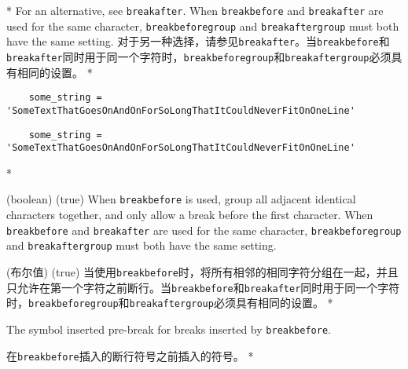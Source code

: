 \begin{paracol}{2}
\begin{optionlist}
\switchcolumn[0]*%
 For an alternative, see \texttt{breakafter}.  When \texttt{breakbefore} and \texttt{breakafter} are used for the same character, \texttt{breakbeforegroup} and \texttt{breakaftergroup} must both have the same setting.
 \switchcolumn
对于另一种选择，请参见\texttt{breakafter}。当\texttt{breakbefore}和\texttt{breakafter}同时用于同一个字符时，\texttt{breakbeforegroup}和\texttt{breakaftergroup}必须具有相同的设置。
\switchcolumn[0]*%
\begin{longexample}
    \begin{verbatim}
    some_string = 'SomeTextThatGoesOnAndOnForSoLongThatItCouldNeverFitOnOneLine'
    \end{verbatim}
\end{longexample}
\switchcolumn
\begin{longexample}
    \begin{verbatim}
    some_string = 'SomeTextThatGoesOnAndOnForSoLongThatItCouldNeverFitOnOneLine'
    \end{verbatim}
\end{longexample}
\switchcolumn[0]*%
  \item[breakbeforegroup] (boolean) (true)
    When \texttt{breakbefore} is used, group all adjacent identical characters together, 
    and only allow a break before the first character.  When \texttt{breakbefore} and 
    \texttt{breakafter} are used for the same character, \texttt{breakbeforegroup} and 
    \texttt{breakaftergroup} must both have the same setting.
    \switchcolumn
    \item[breakbeforegroup] (布尔值) (true)
    当使用\texttt{breakbefore}时，将所有相邻的相同字符分组在一起，并且只允许在第一个字符之前断行。当\texttt{breakbefore}和\texttt{breakafter}同时用于同一个字符时，\texttt{breakbeforegroup}和\texttt{breakaftergroup}必须具有相同的设置。
\switchcolumn[0]*%
  \item[breakbeforesymbolpre (string) (\string\,\string\footnotesize\string\ensuremath\{\_\string\rfloor\}, \,\footnotesize\ensuremath{_\rfloor})]
    The symbol inserted pre-break for breaks inserted by \texttt{breakbefore}.
    \switchcolumn
    \item[breakbeforesymbolpre (字符串) (\string\,\string\footnotesize\string\ensuremath\{\_\string\rfloor\}, \,\footnotesize\ensuremath{_\rfloor})]
    在\texttt{breakbefore}插入的断行符号之前插入的符号。
    \switchcolumn[0]*%
  \item[breakbeforesymbolpost (string) (\meta{none})]

\end{optionlist}
\end{paracol}
